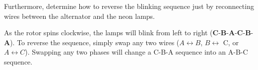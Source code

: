 Furthermore, determine how to reverse the blinking sequence just by reconnecting wires between the alternator and the neon lamps.







As the rotor spins clockwise, the lamps will blink from left to right ({\bf C}-{\bf B}-{\bf A}-{\bf C}-{\bf B}-{\bf A}).  To reverse the sequence, simply swap any two wires ($A \leftrightarrow B$, $B \leftrightarrow$ C, or $A \leftrightarrow C$).  Swapping any two phases will change a C-B-A sequence into an A-B-C sequence.











